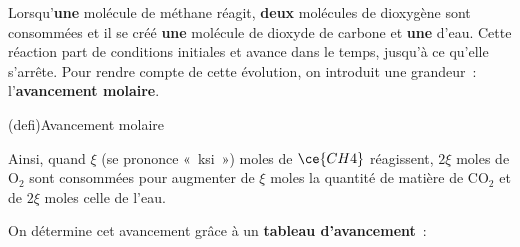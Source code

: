 \documentclass[../../main/main.tex]{subfiles}
\begin{document}
Lorsqu'\textbf{une} molécule de méthane réagit, \textbf{deux} molécules de
dioxygène sont consommées et il se créé \textbf{une} molécule de dioxyde de
carbone et \textbf{une} d'eau. Cette réaction part de conditions initiales et
avance dans le temps, jusqu'à ce qu'elle s'arrête. Pour rendre compte de cette
évolution, on introduit une grandeur~: l'\textbf{avancement molaire}.

\begin{tcb}[label=def:xi, sidebyside, righthand ratio=.3](defi){Avancement molaire}
	\tcblower
\end{tcb}

Ainsi, quand $\xi$ (se prononce «~ksi~») moles de
$\ce{CH4}$ réagissent, $2\xi$ moles de O$_2$ sont consommées pour augmenter de
$\xi$ moles la quantité de matière de CO$_2$ et de $2\xi$ moles celle de l'eau.

On détermine cet avancement grâce à un \textbf{tableau d'avancement}~:
\end{document}
